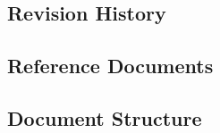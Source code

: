 \documentclass[a4paper,12pt]{article}
\begin{document}
\subsection{Revision History}
\subsection{Reference Documents}
\subsection{Document Structure}
\pagebreak

\end{document}
